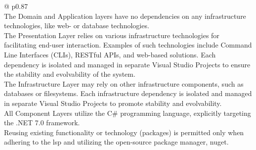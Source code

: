 \begin{table}[H]
    \begin{tabular}{@{\makebox[2em][c]{\rownumber\space}}  p{0.87\linewidth}}
        \\ 
    \hline
       The Domain and Application layers have no dependencies on any infrastructure technologies, like web- or database
       technologies. 
       \\
       The Presentation Layer relies on various infrastructure technologies for
       facilitating end-user interaction. Examples of such technologies include Command
       Line Interfaces (CLIs), RESTful APIs, and web-based solutions. Each dependency is
       isolated and managed in separate Visual Studio Projects to ensure the stability and
       evolvability of the system. \\

       The Infrastructure Layer may rely on other infrastructure components, such as
       databases or filesystems. Each infrastructure dependency is isolated and managed in
       separate Visual Studio Projects to promote stability and evolvability. \\

       All Component Layers utilize the C\# programming language, explicitly targeting the
       .NET 7.0 framework. \\

       Reusing existing functionality or technology (packages) is permitted only when
       adhering to the \gls{lsp} and utilizing the open-source package manager,
       \gls{nuget}. \\
       \hline
    \end{tabular}
\caption{Application Layer Technology Requirements}
\label{table_requirements_application_layer_technology}
\end{table}
